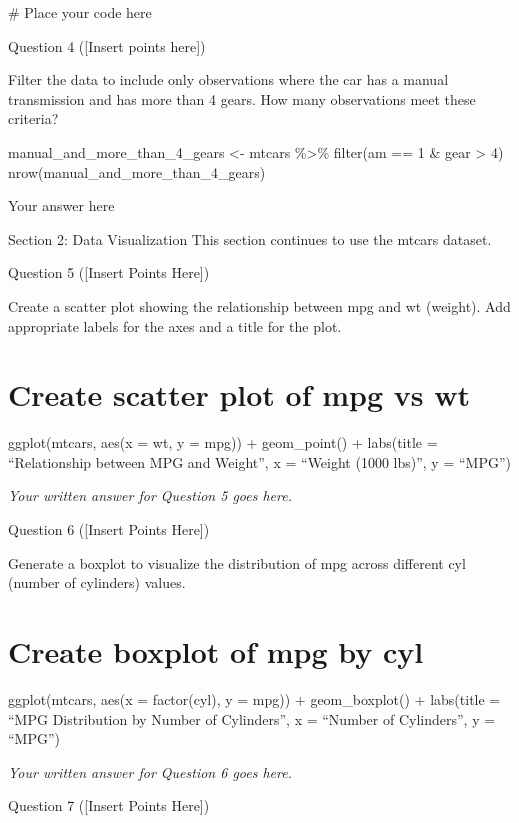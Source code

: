\documentclass[
  letterpaper,
  DIV=11,
  numbers=noendperiod]{scrartcl}
\newenvironment{Shaded}{\begin{snugshade}}{\end{snugshade}}
\newcommand{\CommentTok}[1]{\textcolor[rgb]{0.37,0.37,0.37}{#1}}
\begin{document}
\begin{Shaded}
\begin{Highlighting}[]
\CommentTok{\# Place your code here}
\end{Highlighting}
\end{Shaded}

Question 4 ({[}Insert points here{]})

Filter the data to include only observations where the car has a manual
transmission and has more than 4 gears. How many observations meet these
criteria?

manual\_and\_more\_than\_4\_gears \textless- mtcars \%\textgreater\%
filter(am == 1 \& gear \textgreater{} 4)
nrow(manual\_and\_more\_than\_4\_gears)

Your answer here

Section 2: Data Visualization This section continues to use the mtcars
dataset.

Question 5 ({[}Insert Points Here{]})

Create a scatter plot showing the relationship between mpg and wt
(weight). Add appropriate labels for the axes and a title for the plot.

\section{Create scatter plot of mpg vs
wt}\label{create-scatter-plot-of-mpg-vs-wt}

ggplot(mtcars, aes(x = wt, y = mpg)) + geom\_point() + labs(title =
``Relationship between MPG and Weight'', x = ``Weight (1000 lbs)'', y =
``MPG'')

\emph{Your written answer for Question 5 goes here.}

Question 6 ({[}Insert Points Here{]})

Generate a boxplot to visualize the distribution of mpg across different
cyl (number of cylinders) values.

\section{Create boxplot of mpg by
cyl}\label{create-boxplot-of-mpg-by-cyl}

ggplot(mtcars, aes(x = factor(cyl), y = mpg)) + geom\_boxplot() +
labs(title = ``MPG Distribution by Number of Cylinders'', x = ``Number
of Cylinders'', y = ``MPG'')

\emph{Your written answer for Question 6 goes here.}

Question 7 ({[}Insert Points Here{]})
\end{document}
